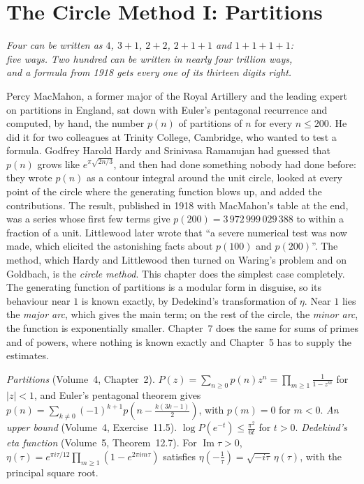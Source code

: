 \chapter{The Circle Method I: Partitions}
\begin{center}\itshape
Four can be written as $4$, $3+1$, $2+2$, $2+1+1$ and $1+1+1+1$:\\
five ways. Two hundred can be written in nearly four trillion ways,\\
and a formula from 1918 gets every one of its thirteen digits right.
\end{center}

Percy MacMahon, a former major of the Royal Artillery and the leading expert on partitions in England, sat down with Euler's pentagonal recurrence and computed, by hand, the number $p(n)$ of partitions of $n$ for every $n\le200$. He did it for two colleagues at Trinity College, Cambridge, who wanted to test a formula. Godfrey Harold Hardy and Srinivasa Ramanujan had guessed that $p(n)$ grows like $e^{\pi\sqrt{2n/3}}$, and then had done something nobody had done before: they wrote $p(n)$ as a contour integral around the unit circle, looked at every point of the circle where the generating function blows up, and added the contributions. The result, published in 1918 with MacMahon's table at the end, was a series whose first few terms give $p(200)=3\,972\,999\,029\,388$ to within a fraction of a unit. Littlewood later wrote that ``a severe numerical test was now made, which elicited the astonishing facts about $p(100)$ and $p(200)$''.
The method, which Hardy and Littlewood then turned on Waring's problem and on Goldbach, is the \emph{circle method}. This chapter does the simplest case completely. The generating function of partitions is a modular form in disguise, so its behaviour near $1$ is known exactly, by Dedekind's transformation of $\eta$. Near $1$ lies the \emph{major arc}, which gives the main term; on the rest of the circle, the \emph{minor arc}, the function is exponentially smaller. Chapter~7 does the same for sums of primes and of powers, where nothing is known exactly and Chapter~5 has to supply the estimates.

\begin{reminder}
\emph{Partitions} (Volume~4, Chapter~2). $P(z)=\sum_{n\ge0}p(n)z^n=\prod_{m\ge1}\frac1{1-z^m}$ for $|z|<1$, and Euler's pentagonal theorem gives $p(n)=\sum_{k\ne0}(-1)^{k+1}p(n-\frac{k(3k-1)}2)$, with $p(m)=0$ for $m<0$.
\emph{An upper bound} (Volume~4, Exercise~11.5). $\log P(e^{-t})\le\frac{\pi^2}{6t}$ for $t>0$.
\emph{Dedekind's eta function} (Volume~5, Theorem~12.7). For $\operatorname{Im}\tau>0$, $\eta(\tau)=e^{\pi i\tau/12}\prod_{m\ge1}(1-e^{2\pi im\tau})$ satisfies $\eta(-\frac1\tau)=\sqrt{-i\tau}\,\eta(\tau)$, with the principal square root.
\end{reminder}

